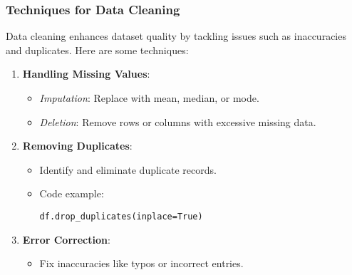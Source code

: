 \documentclass[aspectratio=169]{beamer}
\begin{document}
\begin{frame}[fragile]
    \frametitle{Techniques for Data Cleaning}

    Data cleaning enhances dataset quality by tackling issues such as inaccuracies and duplicates. Here are some techniques:

    \begin{enumerate}
        \item \textbf{Handling Missing Values}:
            \begin{itemize}
                \item \textit{Imputation}: Replace with mean, median, or mode.
                \item \textit{Deletion}: Remove rows or columns with excessive missing data.
            \end{itemize}
        
        \item \textbf{Removing Duplicates}:
            \begin{itemize}
                \item Identify and eliminate duplicate records.
                \item Code example:
                \begin{lstlisting}
df.drop_duplicates(inplace=True)
                \end{lstlisting}
            \end{itemize}
        
        \item \textbf{Error Correction}:
            \begin{itemize}
                \item Fix inaccuracies like typos or incorrect entries.
            \end{itemize}
    \end{enumerate}
\end{frame}
\end{document}
